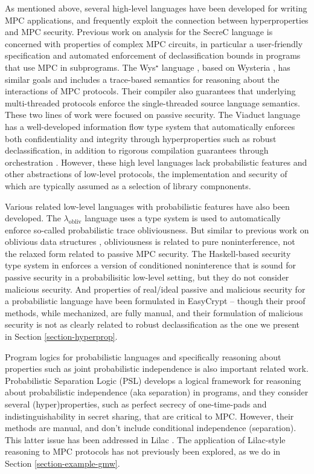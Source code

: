 As mentioned above, several high-level languages have been developed
for writing MPC applications, and frequently exploit the connection
between hyperproperties and MPC security. Previous work on analysis
for the SecreC language
\cite{almeida2018enforcing,10.1145/2637113.2637119} is concerned with
properties of complex MPC circuits, in particular a user-friendly
specification and automated enforcement of declassification bounds in
programs that use MPC in subprograms. The Wys$^\star$ language
\cite{wysstar}, based on Wysteria \cite{rastogi2014wysteria}, has
similar goals and includes a trace-based semantics for reasoning about
the interactions of MPC protocols. Their compiler also guarantees that
underlying multi-threaded protocols enforce the single-threaded source
language semantics. These two lines of work were focused on passive
security. The Viaduct language
\cite{10.1145/3453483.3454074} has a well-developed
information flow type system that automatically enforces both
confidentiality and integrity through hyperproperties such as robust
declassification, in addition to rigorous compilation guarantees
through orchestration \cite{viaduct-UC}. However, these high level
languages lack probabilistic features and other abstractions of
low-level protocols, the implementation and security of which are
typically assumed as a selection of library compnonents.

Various related low-level languages with probabilistic features have
also been developed. The $\lambda_{\mathrm{obliv}}$ language
\cite{darais2019language} uses a type system is used to automatically
enforce so-called probabilistic trace obliviousness.  But similar to
previous work on oblivious data structures \cite{10.1145/3498713},
obliviousness is related to pure noninterference, not the relaxed form
related to passive MPC security. The Haskell-based security type system in
\cite{6266151} enforces a version of conditioned noninterence that is
sound for passive security in a probabilisitic low-level setting, but
they do not consider malicious security. And properties of real/ideal
passive and malicious security for a probabilistic language have been
formulated in EasyCrypt \cite{8429300}-- though their proof methods,
while mechanized, are fully manual, and their formulation of malicious
security is not as clearly related to robust declassification as the
one we present in Section \ref{section-hyperprop}. 

Program logics for probabilistic languages and specifically reasoning
about properties such as joint probabilistic independence is also
important related work. Probabilistic Separation Logic (PSL)
\cite{barthe2019probabilistic} develops a logical framework for
reasoning about probabilistic independence (aka separation) in
programs, and they consider several (hyper)properties, such as perfect
secrecy of one-time-pads and indistinguishability in secret sharing,
that are critical to MPC. However, their methods are manual, and
don't include conditional independence (separation). This
latter issue has been addressed in Lilac \cite{li2023lilac}. The
application of Lilac-style reasoning to MPC protocols has not
previously been explored, as we do in Section
\ref{section-example-gmw}.


